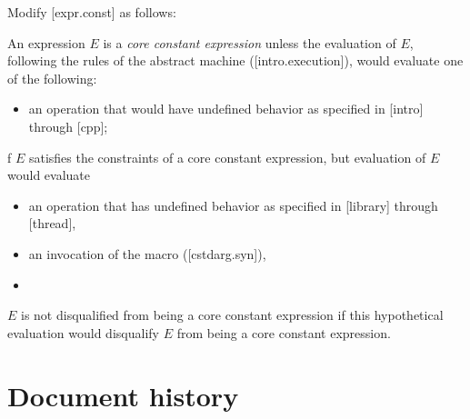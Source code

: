 \pagebreak

Modify [expr.const] as follows:

\begin{adjustwidth}{0.5cm}{0.5cm}

An expression $E$ is a \emph{core constant expression} unless the evaluation of $E$, following the rules of the abstract machine ([intro.execution]), would evaluate one of the following:
\begin{itemize}
\item an operation that would have undefined behavior as specified in [intro] through [cpp];
\end{itemize}

f $E$ satisfies the constraints of a core constant expression, but evaluation of $E$ would evaluate

\begin{itemize}
\item an operation that has undefined behavior as specified in [library] through [thread],
\item an invocation of the  macro ([cstdarg.syn]),
\item {}
\end{itemize}

\begin{addedblock}
\begin{note}
$E$ is not disqualified from being a core constant expression if this hypothetical evaluation would disqualify $E$ from being a core constant expression.
\end{note}
\end{addedblock}


\end{adjustwidth}

\section*{Document history}


